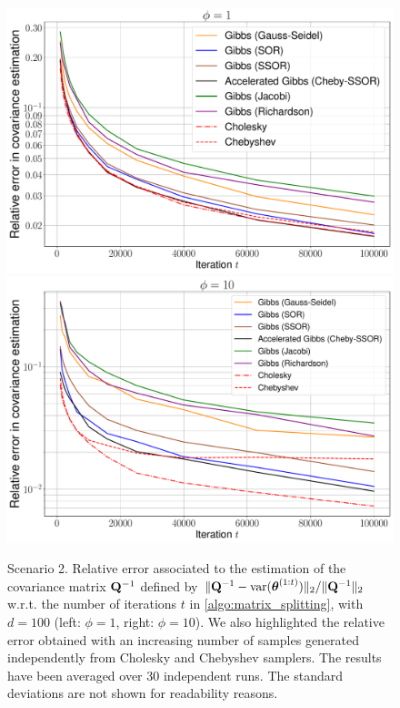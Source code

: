 \documentclass[nohypdvips,onefignum,onetabnum]{siamart171218}
\begin{document}
\begin{figure}
  \mbox{{\includegraphics[scale=0.19]{images/simus2_ex1_convGibbs_phi_1_bis.pdf}}}
  \mbox{{\includegraphics[scale=0.19]{images/simus2_ex1_convGibbs_phi_10_bis.pdf}}}
  \caption{Scenario 2. Relative error associated to the estimation of the covariance matrix $\mathbf{Q}^{-1}$ defined by $\|\mathbf{Q}^{-1} - \mathrm{var}(\boldsymbol{\theta}^{(1:t)})\|_2/\|\mathbf{Q}^{-1}\|_2$  w.r.t. the number of iterations $t$ in \cref{algo:matrix_splitting}, with $d=100$ (left: $\phi=1$, right: $\phi=10$). 
  We also highlighted the relative error obtained with an increasing number of samples generated independently from Cholesky and Chebyshev samplers.
  The results have been averaged over 30 independent runs.
  The standard deviations are not shown for readability reasons.}
\label{fig:scenario_2_results}
\end{figure}
\end{document}
